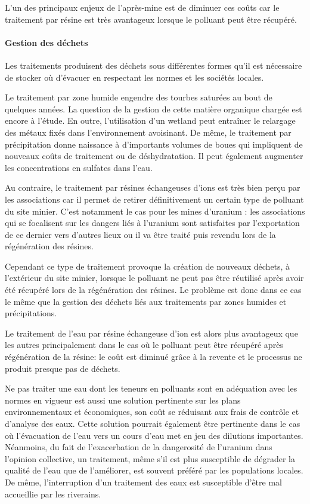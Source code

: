 \documentclass{article}
\begin{document}
L’un des principaux enjeux de l’après-mine est de diminuer ces coûts car le traitement par résine est très avantageux lorsque le polluant peut être récupéré.

\paragraph{Gestion des déchets }

Les traitements produisent des déchets sous différentes formes qu’il est nécessaire de stocker où d’évacuer en respectant les normes et les sociétés locales.

Le traitement par zone humide engendre des tourbes saturées au bout de quelques années. La question de la gestion de cette matière organique chargée est encore à l’étude. En outre, l’utilisation d’un wetland peut entraîner le relargage des métaux fixés dans l’environnement avoisinant.
De même, le traitement par précipitation donne naissance à d’importants volumes de boues qui impliquent de nouveaux coûts de traitement ou de déshydratation. Il peut également augmenter les concentrations en sulfates dans l’eau. 

Au contraire, le traitement par résines échangeuses d’ions est très bien perçu par les associations car il permet de retirer définitivement un certain type de polluant du site minier. C’est notamment le cas pour les mines d’uranium : les associations qui se focalisent sur les dangers liés à l’uranium sont satisfaites par l’exportation de ce dernier vers d’autres lieux ou il va être traité puis revendu lors de la régénération des résines.

Cependant ce type de traitement provoque la création de nouveaux déchets, à l’extérieur du site minier, lorsque le polluant ne peut pas être réutilisé après avoir été récupéré lors de la régénération des résines. Le problème est donc dans ce cas le même que la gestion des déchets liés aux traitements par zones humides et précipitations.

Le traitement de l’eau par résine échangeuse d’ion est alors plus avantageux que les autres principalement dans le cas où le polluant peut être récupéré après régénération de la résine: le coût est diminué grâce à la revente et le processus ne produit presque pas de déchets.

Ne pas traiter une eau dont les teneurs en polluants sont en adéquation avec les normes en vigueur est aussi une solution pertinente sur les plans environnementaux et économiques, son coût se réduisant aux frais de contrôle et d’analyse des eaux. Cette solution pourrait également être pertinente dans le cas où l’évacuation de l’eau vers un cours d’eau met en jeu des dilutions importantes. Néanmoins, du fait de l’exacerbation de la dangerosité de l’uranium dans l’opinion collective, un traitement, même s’il est plus susceptible de dégrader la qualité de l’eau que de l’améliorer, est souvent préféré par les populations locales. De même, l’interruption d’un traitement des eaux est susceptible d’être mal accueillie par les riverains.
\end{document}
